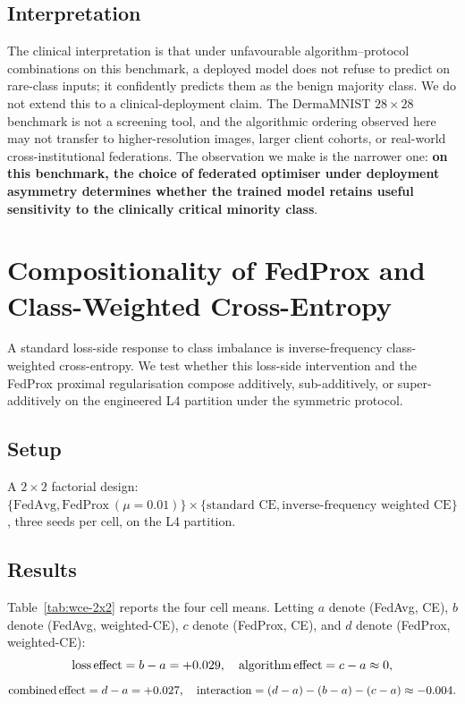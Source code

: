 \documentclass[11pt,a4paper]{report}
\begin{document}
\subsection{Interpretation}
The clinical interpretation is that under unfavourable
algorithm--protocol combinations on this benchmark, a deployed
model does not refuse to predict on rare-class inputs; it
confidently predicts them as the benign majority class. We do not
extend this to a clinical-deployment claim. The DermaMNIST
$28 \times 28$ benchmark is not a screening tool, and the
algorithmic ordering observed here may not transfer to higher-resolution
images, larger client cohorts, or real-world cross-institutional
federations. The observation we make is the narrower one: \textbf{on
this benchmark, the choice of federated optimiser under deployment
asymmetry determines whether the trained model retains useful
sensitivity to the clinically critical minority class}.


\section{Compositionality of FedProx and Class-Weighted Cross-Entropy}
\label{sec:fedprox-wce}

A standard loss-side response to class imbalance is inverse-frequency
class-weighted cross-entropy. We test whether this loss-side
intervention and the FedProx proximal regularisation compose
additively, sub-additively, or super-additively on the engineered
L4 partition under the symmetric protocol.

\subsection{Setup}
A $2 \times 2$ factorial design: $\{\text{FedAvg}, \text{FedProx}~(\mu = 0.01)\}
\times \{\text{standard CE}, \text{inverse-frequency weighted CE}\}$,
three seeds per cell, on the L4 partition.

\subsection{Results}
Table~\ref{tab:wce-2x2} reports the four cell means. Letting $a$
denote (FedAvg, CE), $b$ denote (FedAvg, weighted-CE), $c$ denote
(FedProx, CE), and $d$ denote (FedProx, weighted-CE):
\[
\text{loss\,effect} = b - a = +0.029, \quad
\text{algorithm\,effect} = c - a \approx 0,
\]
\[
\text{combined\,effect} = d - a = +0.027, \quad
\text{interaction} = (d-a) - (b-a) - (c-a) \approx -0.004.
\]
\end{document}
